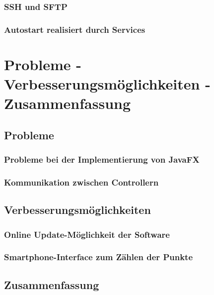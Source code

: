 \subsubsection{SSH und SFTP}
\subsubsection{Autostart realisiert durch Services}

\section{Probleme - Verbesserungsmöglichkeiten - Zusammenfassung}
\subsection{Probleme}
\subsubsection{Probleme bei der Implementierung von JavaFX}
\subsubsection{Kommunikation zwischen Controllern}
\subsubsection{}
\subsection{Verbesserungsmöglichkeiten}
\subsubsection{Online Update-Möglichkeit der Software}
\subsubsection{Smartphone-Interface zum Zählen der Punkte}
\subsection{Zusammenfassung}